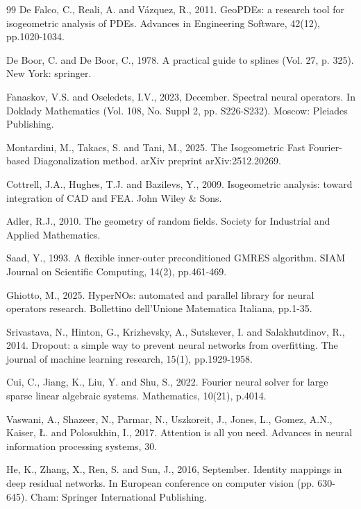 \documentclass{article}
\theoremstyle{plain}
\numberwithin{equation}{section}
\begin{document}
\begin{thebibliography}{99}
    De Falco, C., Reali, A. and Vázquez, R., 2011. GeoPDEs: a research tool for isogeometric analysis of PDEs. Advances in Engineering Software, 42(12), pp.1020-1034.

    De Boor, C. and De Boor, C., 1978. A practical guide to splines (Vol. 27, p. 325). New York: springer.

    Fanaskov, V.S. and Oseledets, I.V., 2023, December. Spectral neural operators. In Doklady Mathematics (Vol. 108, No. Suppl 2, pp. S226-S232). Moscow: Pleiades Publishing.

    Montardini, M., Takacs, S. and Tani, M., 2025. The Isogeometric Fast Fourier-based Diagonalization method. arXiv preprint arXiv:2512.20269.

    Cottrell, J.A., Hughes, T.J. and Bazilevs, Y., 2009. Isogeometric analysis: toward integration of CAD and FEA. John Wiley $\&$ Sons.

    Adler, R.J., 2010. The geometry of random fields. Society for Industrial and Applied Mathematics.

    Saad, Y., 1993. A flexible inner-outer preconditioned GMRES algorithm. SIAM Journal on Scientific Computing, 14(2), pp.461-469.

    Ghiotto, M., 2025. HyperNOs: automated and parallel library for neural operators research. Bollettino dell'Unione Matematica Italiana, pp.1-35.

    Srivastava, N., Hinton, G., Krizhevsky, A., Sutskever, I. and Salakhutdinov, R., 2014. Dropout: a simple way to prevent neural networks from overfitting. The journal of machine learning research, 15(1), pp.1929-1958.

    Cui, C., Jiang, K., Liu, Y. and Shu, S., 2022. Fourier neural solver for large sparse linear algebraic systems. Mathematics, 10(21), p.4014.

    Vaswani, A., Shazeer, N., Parmar, N., Uszkoreit, J., Jones, L., Gomez, A.N., Kaiser, Ł. and Polosukhin, I., 2017. Attention is all you need. Advances in neural information processing systems, 30.

    He, K., Zhang, X., Ren, S. and Sun, J., 2016, September. Identity mappings in deep residual networks. In European conference on computer vision (pp. 630-645). Cham: Springer International Publishing.


\end{thebibliography}
\end{document}
